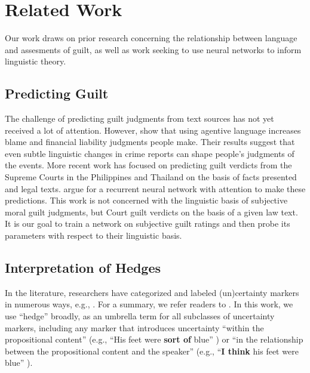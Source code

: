 \documentclass[11pt,a4paper]{article}
\begin{document}
\section{Related Work}

Our work draws on prior research concerning the relationship between language and assesments of guilt, as well as work seeking to use neural networks to inform linguistic theory.


\subsection{Predicting Guilt}
The challenge of predicting guilt judgments from text sources has not yet received a lot of attention. 
However, \citeauthor{Fausey:Boroditsky:2010} show that using agentive language increases blame and financial liability judgments people make. Their results suggest that even subtle linguistic changes in crime reports can shape people's judgments of the events.
More recent work has focused on predicting guilt verdicts from the Supreme Courts in the Philippines \citep{virtucio2018predicting} and Thailand \citep{kowsrihawat2018predicting} on the basis of facts presented and legal texts. \citeauthor{kowsrihawat2018predicting} argue for a recurrent neural network with attention to make these predictions. This work is not concerned with the linguistic basis of subjective moral guilt judgments, but Court guilt verdicts on the basis of a given law text. 
It is our goal to train a network on subjective guilt ratings and then probe its parameters with respect to their linguistic basis.

\subsection{Interpretation of Hedges}

In the literature, researchers have categorized and labeled (un)certainty markers in numerous ways, e.g., \citep{lakoff1972hedges, prince1982hedging, brown1987politeness}. For a summary, we refer readers to \citealt{fraser2010pragmatic}. 
In this work, we use ``hedge'' broadly, as an umbrella term for all subclasses of uncertainty markers, including any marker that introduces uncertainty ``within the propositional content'' (e.g., ``His feet were \textbf{sort of} blue'' \citep{prince1982hedging}) or ``in the relationship between the propositional content and the speaker'' (e.g., ``\textbf{I think} his feet were blue'' \citep{prince1982hedging}).
\end{document}

